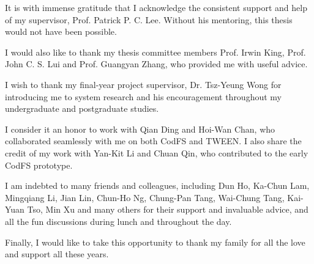 It is with immense gratitude that I acknowledge the consistent support and help
of my supervisor, Prof. Patrick P. C. Lee. Without his mentoring, this thesis
would not have been possible.

I would also like to thank my thesis committee members Prof. Irwin King, Prof.
John C. S. Lui and Prof. Guangyan Zhang, who provided me with useful advice.

I wish to thank my final-year project supervisor, Dr. Tsz-Yeung Wong for
introducing me to system research and his encouragement throughout my
undergraduate and postgraduate studies.

I consider it an honor to work with Qian Ding and Hoi-Wan Chan, who collaborated
seamlessly with me on both CodFS and TWEEN. I also share the credit of my work
with Yan-Kit Li and Chuan Qin, who contributed to the early CodFS prototype.  

I am indebted to many friends and colleagues, including Dun Ho, Ka-Chun Lam, Mingqiang Li,
Jian Lin, Chun-Ho Ng, Chung-Pan Tang, Wai-Chung Tang, Kai-Yuan Tso, Min Xu and
many others for their support and invaluable advice, and all the fun discussions
during lunch and throughout the day. 

Finally, I would like to take this opportunity to thank my family for all the
love and support all these years.
